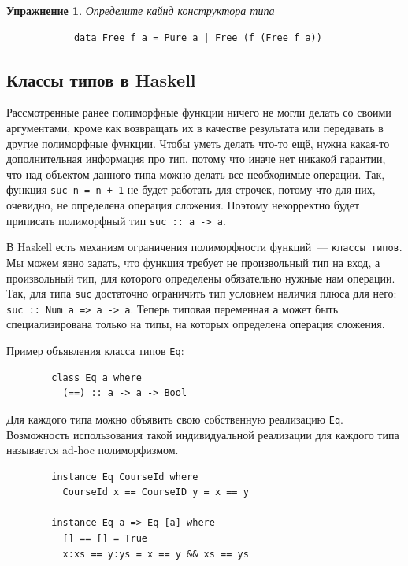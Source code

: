 \documentclass[12pt]{article}
\newtheorem{task}{Упражнение}
\begin{document}
    \begin{task}
        Определите кайнд конструктора типа
        \begin{verbatim}
            data Free f a = Pure a | Free (f (Free f a))
        \end{verbatim}
    \end{task}

    \subsection{Классы типов в Haskell}

    Рассмотренные ранее полиморфные функции ничего не могли делать со своими аргументами, кроме как возвращать их в качестве результата или передавать в другие полиморфные функции.
    Чтобы уметь делать что-то ещё, нужна какая-то дополнительная информация про тип, потому что иначе нет никакой гарантии, что над объектом данного типа можно делать все необходимые операции.
    Так, функция \texttt{suc n = n + 1} не будет работать для строчек, потому что для них, очевидно, не определена операция сложения.
    Поэтому некорректно будет приписать полиморфный тип \texttt{suc :: a -> a}.

    В Haskell есть механизм ограничения полиморфности функций~--- \texttt{классы типов}.
    Мы можем явно задать, что функция требует не произвольный тип на вход, а произвольный тип, для которого определены обязательно нужные нам операции.
    Так, для типа \texttt{suc} достаточно ограничить тип условием наличия плюса для него: \texttt{suc :: Num a => a -> a}.
    Теперь типовая переменная \texttt{a} может быть специализирована только на типы, на которых определена операция сложения.

    Пример объявления класса типов \texttt{Eq}:
    \begin{verbatim}
        class Eq a where
          (==) :: a -> a -> Bool
    \end{verbatim}

    Для каждого типа можно объявить свою собственную реализацию \texttt{Eq}.
    Возможность использования такой индивидуальной реализации для каждого типа называется ad-hoc полиморфизмом.
    \begin{verbatim}
        instance Eq CourseId where
          CourseId x == CourseID y = x == y

        instance Eq a => Eq [a] where
          [] == [] = True
          x:xs == y:ys = x == y && xs == ys
    \end{verbatim}
\end{document}
